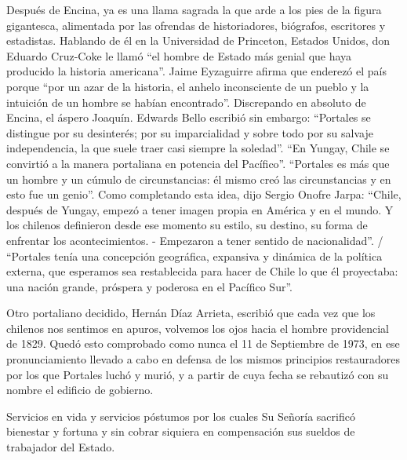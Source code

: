 \documentclass[10pt,twoside,openright]{memoir}
\begin{document}
Después de Encina, ya es una llama sagrada la que arde a los pies de la
figura gigantesca, alimentada por las ofrendas de historiadores,
biógrafos, escritores y estadistas. Hablando de él en la Universidad de
Princeton, Estados Unidos, don Eduardo Cruz-Coke le llamó ``el hombre de
Estado más genial que haya producido la historia americana''. Jaime
Eyzaguirre afirma que enderezó el país porque ``por un azar de la
historia, el anhelo inconsciente de un pueblo y la intuición de un
hombre se habían encontrado''. Discrepando en absoluto de Encina, el
áspero Joaquín. Edwards Bello escribió sin embargo: ``Portales se
distingue por su desinterés; por su imparcialidad y sobre todo por su
salvaje independencia, la que suele traer casi siempre la soledad''. ``En
Yungay, Chile se convirtió a la manera portaliana en potencia del
Pacífico''. ``Portales es más que un hombre y un cúmulo de circunstancias:
él mismo creó las circunstancias y en esto fue un genio''. Como
completando esta idea, dijo Sergio Onofre Jarpa: ``Chile, después de
Yungay, empezó a tener imagen propia en América y en el mundo. Y los
chilenos definieron desde ese momento su estilo, su destino, su forma de
enfrentar los acontecimientos. - Empezaron a tener sentido de
nacionalidad''. / ``Portales tenía una concepción geográfica, expansiva y
dinámica de la política externa, que esperamos sea restablecida para
hacer de Chile lo que él proyectaba: una nación grande, próspera y
poderosa en el Pacífico Sur''.

Otro portaliano decidido, Hernán Díaz Arrieta, escribió que cada vez que
los chilenos nos sentimos en apuros, volvemos los ojos hacia el hombre
providencial de 1829. Quedó esto comprobado como nunca el 11 de
Septiembre de 1973, en ese pronunciamiento llevado a cabo en defensa de
los mismos principios restauradores por los que Portales luchó y murió,
y a partir de cuya fecha se rebautizó con su nombre el edificio de
gobierno.

Servicios en vida y servicios póstumos por los cuales Su Señoría
sacrificó bienestar y fortuna y sin cobrar siquiera en compensación sus
sueldos de trabajador del Estado.
\end{document}
